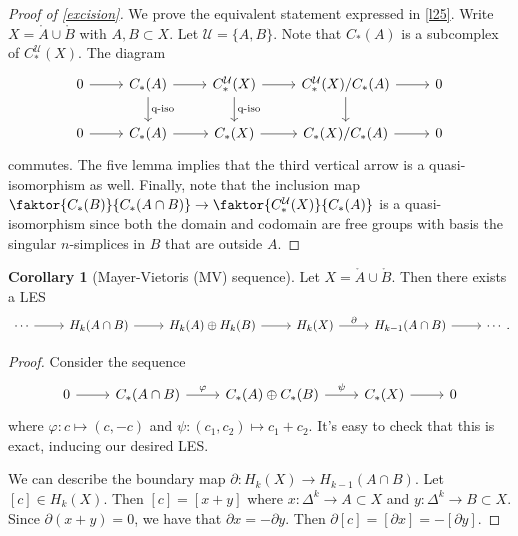 \documentclass[10pt,letterpaper,cm]{nupset}
\theoremstyle{definition}
\theoremstyle{theorem}
\newtheorem{corollary}[definition]{Corollary}
\theoremstyle{remark}
\newcommand{\U}{\mathcal U}
\newcommand{\1}{\mathbb{1}}
\newcommand{\0}{\vec 0}
\begin{document}
\medskip

\begin{proof}[Proof of \cref{excision}]
We prove the equivalent statement expressed in \cref{l25}. Write $X = \mathring{A}\cup \mathring{B}$ with $A,B\subset X$. Let $\U =\{A, B\}$. Note that $C_{\ast}(A)$ is a subcomplex of $C_{\ast}^{\U}(X)$. The diagram
\[
\begin{tikzcd}
0 \arrow[r] & C_{\ast}(A) \arrow[r] \arrow[d, "\text{q-iso}"] & C_{\ast}^{\U}(X) \arrow[r] \arrow[d, "\text{q-iso}"] & C_{\ast}^{\U}(X)/C_{\ast}(A) \arrow[r] \arrow[d] & 0 \\
0 \arrow[r] & C_{\ast}(A) \arrow[r]                          & C_{\ast}(X) \arrow[r]                                & C_{\ast}(X)/C_{\ast}(A) \arrow[r]                & 0
\end{tikzcd}
\] commutes. The five lemma implies that the third vertical arrow is a quasi-isomorphism as well. Finally, note that the inclusion map $\faktor{C_{\ast}(B)}{C_{\ast}(A\cap B)} \to \faktor{C_{\ast}^{\U}(X)}{C_{\ast}(A)}$ is a quasi-isomorphism since both the domain and codomain are free groups with basis the singular $n$-simplices in $B$ that are outside $A$.
\end{proof}

\begin{corollary}[Mayer-Vietoris (MV) sequence]
Let $X= \mathring{A} \cup \mathring{B}$. Then there exists a LES 
\[
\begin{tikzcd}
\cdots \arrow[r] & H_k(A\cap B) \arrow[r] & H_k(A)\oplus H_k(B) \arrow[r] & H_k(X) \arrow[r, "\partial"] & H_{k-1}(A\cap B) \arrow[r] & \cdots
\end{tikzcd}
.\]
\end{corollary}
\begin{proof}
Consider the sequence
\[
\begin{tikzcd}
0 \arrow[r] & C_{\ast}(A\cap B) \arrow[r, "\varphi"] & C_{\ast}(A)\oplus C_{\ast}(B) \arrow[r, "\psi"] & C_{\ast}(X) \arrow[r] & 0
\end{tikzcd}
\] where $\varphi : c \mapsto (c, -c)$ and $\psi : (c_1, c_2) \mapsto c_1 + c_2$. It's easy to check that this is exact, inducing our desired LES.

\medskip

 We can describe the boundary map $\partial : H_k(X) \to H_{k-1}(A\cap B)$. Let $[c] \in H_k(X)$. Then $[c] = [x+y]$ where $x : \Delta^k \to A\subset X$ and $y: \Delta^k \to B\subset X$. Since $\partial(x+y)  =0$, we have that $\partial{x}={-\partial{y}}$. Then $\partial{[c]} =[\partial{x}] = {-[\partial{y}]}$.
\end{proof}
\end{document}
